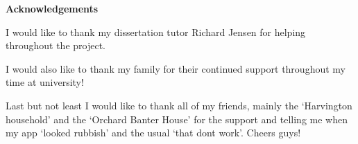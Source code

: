 \thispagestyle{empty}

\begin{center}
    {\LARGE\bf Acknowledgements}
\end{center}

I would like to thank my dissertation tutor Richard Jensen for helping throughout the project.

I would also like to thank my family for their continued support throughout my time at university!

Last but not least I would like to thank all of my friends, mainly the `Harvington household' and the `Orchard Banter House' for the support and telling me when my app `looked rubbish' and the usual `that dont work'. Cheers guys! 